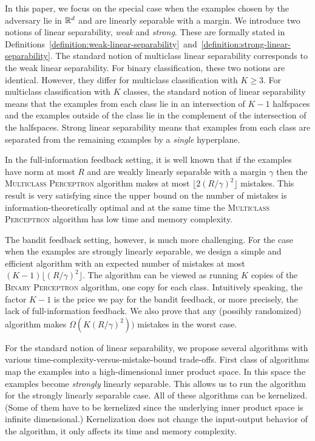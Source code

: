 In this paper, we focus on the special case when the examples chosen by the
adversary lie in $\mathbb{R}^d$ and are linearly separable with a margin. We introduce
two notions of linear separability, \emph{weak} and \emph{strong}. These are
formally stated in
Definitions~\ref{definition:weak-linear-separability}~and~\ref{definition:strong-linear-separability}.
The standard notion of multiclass linear separability corresponds to the weak
linear separability. For binary classification, these two notions are
identical. However, they differ for multiclass classification with $K \geq 3$.
For multiclass classification with $K$ classes, the standard notion of linear
separability means that the examples from each class lie in an intersection of
$K-1$ halfspaces and the examples outside of the class lie in the complement of
the intersection of the halfspaces. Strong linear separability means that
examples from each class are separated from the remaining examples by a
\emph{single} hyperplane.

In the full-information feedback setting, it is well known that if the examples
have norm at most $R$ and are weakly linearly separable with a margin $\gamma$
then the \textsc{Multiclass Perceptron} algorithm makes at most $\lfloor
2(R/\gamma)^2 \rfloor$ mistakes. This result is very satisfying since the upper
bound on the number of mistakes is information-theoretically optimal and at the
same time the \textsc{Multiclass Perceptron} algorithm has low time and memory
complexity.

The bandit feedback setting, however, is much more challenging. For the case
when the examples are strongly linearly separable, we design a simple and
efficient algorithm with an expected number of mistakes at most $(K-1) \lfloor
(R/\gamma)^2 \rfloor$. The algorithm can be viewed as running $K$ copies of the
\textsc{Binary Perceptron} algorithm, one copy for each class. Intuitively
speaking, the factor $K-1$ is the price we pay for the bandit feedback, or more
precisely, the lack of full-information feedback. We also prove that any
(possibly randomized) algorithm makes $\Omega(K (R/\gamma)^2))$ mistakes in the
worst case.

For the standard notion of linear separability, we propose several algorithms
with various time-complexity-versus-mistake-bound trade-offs.
First class of
algorithms map the examples into a high-dimensional inner product space. In this
space the examples become \emph{strongly} linearly separable. This allows us to
run the algorithm for the strongly linearly separable case. All of these
algorithms can be kernelized. (Some of them have to be kernelized since the
underlying inner product space is infinite dimensional.) Kernelization does not
change the input-output behavior of the algorithm, it only affects its time
and memory complexity.

